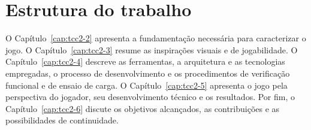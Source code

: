 \section{Estrutura do trabalho}\label{sec:1.5}

O Capítulo~\ref{cap:tcc2-2} apresenta a fundamentação necessária para caracterizar o jogo. O Capítulo~\ref{cap:tcc2-3} resume as inspirações visuais e de jogabilidade. O Capítulo~\ref{cap:tcc2-4} descreve as ferramentas, a arquitetura e as tecnologias empregadas, o processo de desenvolvimento e os procedimentos de verificação funcional e de ensaio de carga. O Capítulo~\ref{cap:tcc2-5} apresenta o jogo pela perspectiva do jogador, seu desenvolvimento técnico e os resultados. Por fim, o Capítulo~\ref{cap:tcc2-6} discute os objetivos alcançados, as contribuições e as possibilidades de continuidade.
